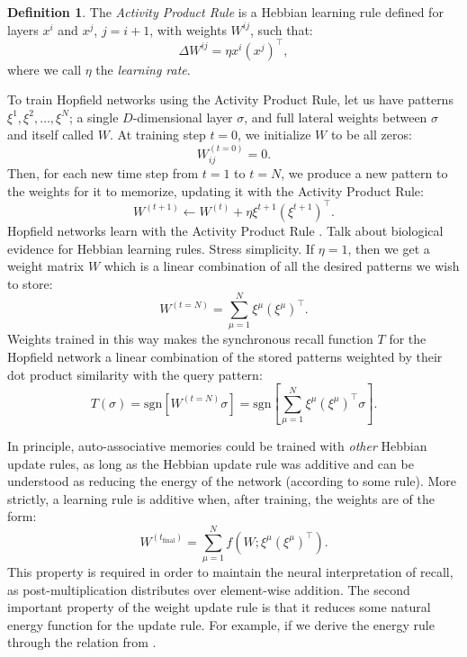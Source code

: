 \documentclass{article}
\theoremstyle{definition}
\newtheorem{definition}{Definition}[subsection]
\begin{document}
\begin{definition}\label{def:activity-product}
  The \textit{Activity Product Rule} is a Hebbian learning rule defined
  for layers $x^i$ and $x^j$, $j = i+1$, with weights $W^{ij}$, such that:
  \begin{equation}
    \Delta W^{ij} = \eta x^i (x^j)^\top,
  \end{equation}
  where we call $\eta$ the \textit{learning rate}.
\end{definition}
\noindent
To train Hopfield networks using the Activity Product Rule,
let us have patterns $\xi^1, \xi^2, \dots, \xi^N$; a single
$D$-dimensional layer $\sigma$, and full lateral weights between $\sigma$
and itself called $W$. At training step $t=0$, we initialize $W$
to be all zeros:
\begin{equation}
  W^{(t=0)}_{ij} = 0.
\end{equation}
Then, for each new time step from $t=1$ to $t = N$, we produce a new
pattern to the weights for it to memorize, updating it with
the Activity Product Rule:
\begin{equation}
  W^{(t+1)} \gets W^{(t)} + \eta \xi^{t+1} (\xi^{t+1})^\top.
\end{equation}Hopfield networks learn with the Activity Product Rule
\parencite{haykin_neural_2009}.
Talk about biological evidence for Hebbian learning rules. Stress simplicity.
If $\eta = 1$, then we get a weight matrix $W$ which is a
linear combination of all the desired patterns we wish to store:
\begin{equation}
  W^{(t=N)} = \sum^N_{\mu=1} \xi^\mu (\xi^\mu)^\top.
\end{equation}
Weights trained in this way makes the synchronous recall function $T$
for the Hopfield network a linear combination of the stored patterns
weighted by their dot product similarity with the query pattern:
\begin{equation}
  T(\sigma) = \text{sgn}\left[W^{(t=N)} \sigma \right] =
  \text{sgn}\left[ \sum^N_{\mu=1} \xi^\mu (\xi^\mu)^\top \sigma\right].
\end{equation}

In principle, auto-associative memories could be trained with
\textit{other} Hebbian update rules, as long as the Hebbian update
rule was additive and can be understood as reducing the energy of the network
(according to some rule). More strictly, a learning rule is additive when,
after training, the weights are of the form:
\begin{equation}
  W^{(t_\text{final})} = \sum^N_{\mu = 1} f(W; \xi^\mu (\xi^\mu)^\top).
\end{equation}
This property is required in order to maintain the neural interpretation
of recall, as post-multiplication distributes over element-wise addition.
The second important property of the weight update rule is that it reduces
some natural energy function for the update rule. For example, if we derive the
energy rule through the relation from \textcite{krotov_hierarchical_2021}.
\end{document}

